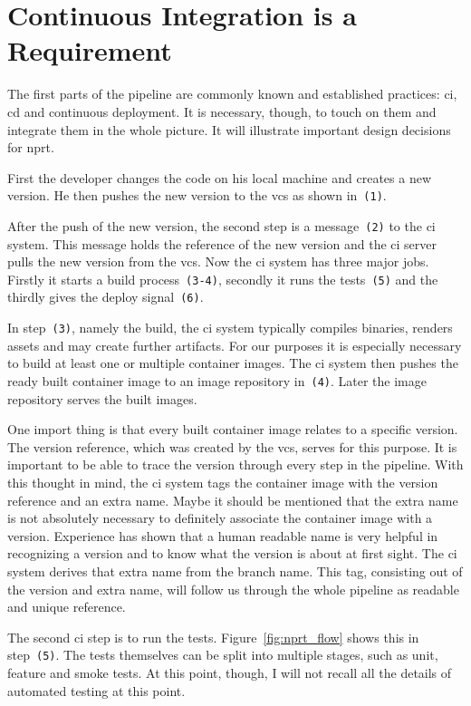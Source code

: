\section{Continuous Integration is a Requirement}

The first parts of the pipeline are commonly known and established practices: \gls{ci},
\gls{cd} and continuous deployment. It is necessary, though, to touch on them and
integrate them in the whole picture. It will illustrate important design decisions for
\gls{nprt}.

First the developer changes the code on his local machine and creates a new version. He
then pushes the new version to the \gls{vcs} as shown in~\texttt{(1)}.

After the push of the new version, the second step is a message~\texttt{(2)} to the
\gls{ci} system. This message holds the reference of the new version and the \gls{ci}
server pulls the new version from the \gls{vcs}. Now the \gls{ci} system has three major
jobs. Firstly it starts a build process~\texttt{(3-4)}, secondly it runs the
tests~\texttt{(5)} and the thirdly gives the deploy signal~\texttt{(6)}.

In step~\texttt{(3)}, namely the build, the \gls{ci} system typically compiles binaries,
renders assets and may create further artifacts. For our purposes it is especially
necessary to build at least one or multiple container images. The \gls{ci} system then
pushes the ready built container image to an image repository in~\texttt{(4)}. Later the
image repository serves the built images.

One import thing is that every built container image relates to a specific version. The
version reference, which was created by the \gls{vcs}, serves for this purpose. It is
important to be able to trace the version through every step in the pipeline. With this
thought in mind, the \gls{ci} system tags the container image with the version reference
and an extra name. Maybe it should be mentioned that the extra name is not absolutely necessary to
definitely associate the container image with a version. Experience has shown that a human
readable name is very helpful in recognizing a version and to know what the version is about
at first sight. The \gls{ci} system derives that extra name from the branch name. This
tag, consisting out of the version and extra name, will follow us through the whole
pipeline as readable and unique reference.

The second \gls{ci} step is to run the tests. Figure~\ref{fig:nprt_flow} shows this in
step~\texttt{(5)}. The tests themselves can be split into multiple stages, such as unit,
feature and smoke tests. At this point, though, I will not recall all the details of
automated testing at this point.

